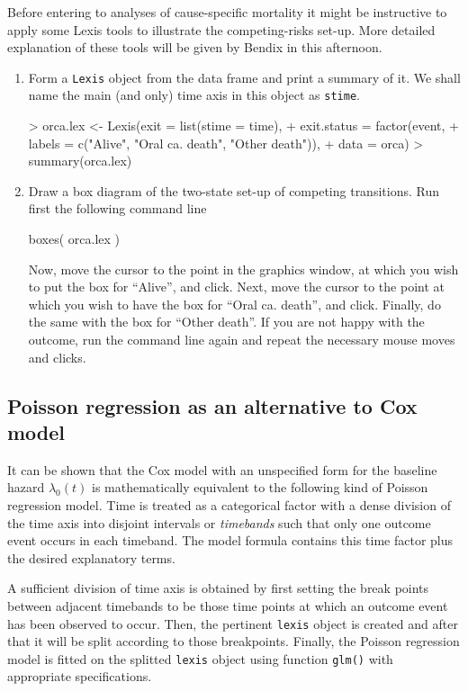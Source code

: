 Before entering to analyses of cause-specific mortality it might
be instructive to apply some Lexis tools
to illustrate the competing-risks set-up.
More detailed explanation of these tools will be given by Bendix in this afternoon.

\begin{enumerate}
\item
Form a \texttt{Lexis} object from the data frame and
print a summary of it. We shall name the main (and only) time axis
in this object as {\tt stime}.
\begin{Schunk}
\begin{Sinput}
> orca.lex <- Lexis(exit = list(stime = time),
+            exit.status = factor(event,
+    labels = c("Alive", "Oral ca. death", "Other death")),
+                   data = orca)
> summary(orca.lex)
\end{Sinput}
\end{Schunk}

\item
Draw a box diagram of the two-state set-up of competing transitions. Run first the following command line
\begin{Schunk}
\begin{Sinput}
boxes( orca.lex )
\end{Sinput}
\end{Schunk}
Now, move the cursor to the point in the graphics window, at which you wish to put the box for ``Alive'', and click. Next, move
the cursor to the point at which you wish to have the  box for ``Oral ca. death'', and click. Finally, do the same with the box for ``Other death''.
If you are not happy with the outcome, run the command line again and repeat the necessary mouse moves and clicks.
\end{enumerate}
\subsection{Poisson regression as an alternative to Cox model}

It can be shown that the Cox model with an unspecified form for the
baseline hazard $\lambda_0(t)$ is mathematically equivalent
to the following kind of Poisson regression model.
Time is treated as a categorical factor with
a dense division of the time axis
into disjoint intervals or {\it timebands} such that
only one outcome event occurs in each timeband.
The model formula contains this time factor plus the desired
explanatory terms.

A sufficient division of time axis is obtained by
first setting the break points
between adjacent timebands to be those time points at which an outcome event has been observed to occur. Then,
the pertinent {\tt lexis} object is created
and after that it will be split according to those breakpoints.
Finally, the Poisson regression model is fitted
on the splitted {\tt lexis} object using function {\tt glm()} with appropriate specifications.

